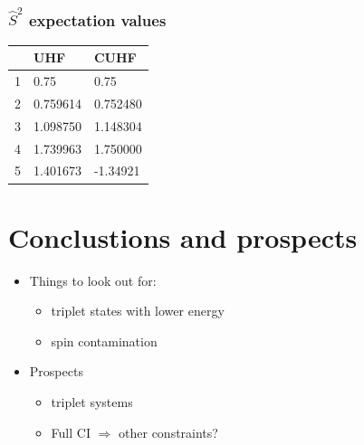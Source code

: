 \documentclass[aspectratio=169]{beamer}
\begin{document}
\begin{frame}
    \frametitle{$\hat{S}^2$ expectation values}
    \begin{table}[h]
        \label{tab:spincon}
        \begin{tabular}{l|l|l}
            & UHF      & CUHF     \\
          \hline
          1 & 0.75     & 0.75     \\
          2 & 0.759614 & 0.752480 \\
          3 & 1.098750 & 1.148304 \\
          4 & 1.739963 & 1.750000 \\
          5 & 1.401673 & -1.34921
        \end{tabular}
      \end{table}
\end{frame}
\section{Conclustions and prospects}
\begin{frame}
    \begin{itemize}
        \item Things to look out for:
        \begin{itemize}
            \item triplet states with lower energy
            \item spin contamination
        \end{itemize}
        \item Prospects
        \begin{itemize}
            \item triplet systems
            \item Full CI $\Longrightarrow$ other constraints?
        \end{itemize}
    \end{itemize}
    
\end{frame}

\titleframe
\end{document}
